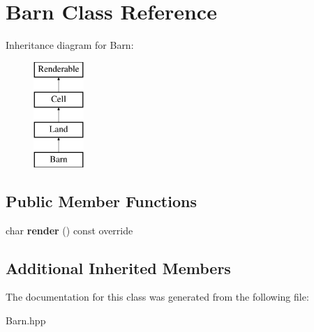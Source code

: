 \hypertarget{class_barn}{}\section{Barn Class Reference}
\label{class_barn}
Inheritance diagram for Barn\+:\begin{figure}[H]
\begin{center}
\leavevmode
\includegraphics[height=4.000000cm]{class_barn}
\end{center}
\end{figure}
\subsection*{Public Member Functions}
\begin{DoxyCompactItemize}
\item 
\mbox{\label{class_barn_ab823bc99099a48de0343f0841b446669}} 
char {\bfseries render} () const override
\end{DoxyCompactItemize}
\subsection*{Additional Inherited Members}


The documentation for this class was generated from the following file\+:\begin{DoxyCompactItemize}
\item 
Barn.\+hpp\end{DoxyCompactItemize}
